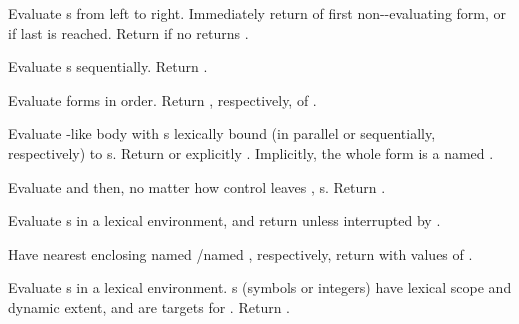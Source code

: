 \begin{LIST}{1cm}
  {
    Evaluate s from left to
    right. Immediately return  of first
    non-\NIL-evaluating form, or  if last 
    is reached. Return \retval{\NIL} if no  returns \T.
  }

  {\label{:progn}
    Evaluate s sequentially. Return
    .
  }

  {
  Evaluate forms in order. Return ,
  respectively, of . 
  }

  {
    Evaluate -like body with s lexically bound (in
    parallel or sequentially, respectively) to s. Return
    \retval{\NIL} or explicitly .
    Implicitly, the whole form is a  named \NIL. 
  }

  {
    Evaluate  and then, no matter how control leaves
    , s. Return . 
  }

  { 
    Evaluate s in a lexical environment, and
    return  unless interrupted by
    . 
  }

  {
    Have nearest enclosing  named /named \NIL,
    respectively, return with values of .  
  }

  {
    Evaluate s in a lexical environment. s (symbols
    or integers) have lexical scope and dynamic extent, and are
    targets for . Return \retval{\NIL}.
  }


\end{LIST}
